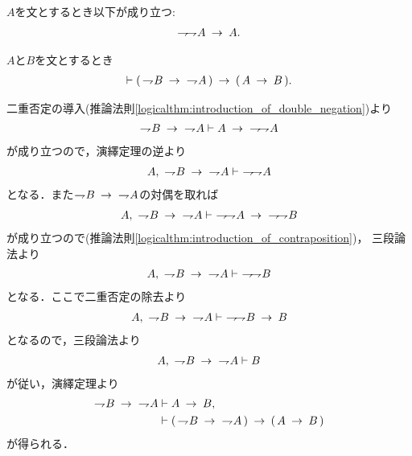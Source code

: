 	\begin{screen}
		\begin{logicalaxm}[二重否定の除去]
		\label{logicalaxm:elimination_of_double_negation}
			$A$を文とするとき以下が成り立つ:
			\begin{align}
				\negation \negation A \rarrow A.
			\end{align}
		\end{logicalaxm}
	\end{screen}
	
	\begin{screen}
		\begin{logicalthm}[対偶論法の原理]
		\label{logicalthm:proof_by_contraposition}
			$A$と$B$を文とするとき
			\begin{align}
				\vdash (\, \negation B \rarrow\ \negation A\, )
				\rarrow (\, A \rarrow B\, ).
			\end{align}
		\end{logicalthm}
	\end{screen}
	
	\begin{prf}
		二重否定の導入(推論法則\ref{logicalthm:introduction_of_double_negation})より
		\begin{align}
			\negation B \rarrow\ \negation A \vdash 
			A \rarrow\ \negation \negation A
		\end{align}
		が成り立つので，演繹定理の逆より
		\begin{align}
			A,\ \negation B \rarrow\ \negation A \vdash\ \negation \negation A
		\end{align}
		となる．また$\negation B \rarrow\ \negation A$の対偶を取れば
		\begin{align}
			A,\ \negation B \rarrow\ \negation A \vdash\ 
			\negation \negation A \rarrow\ \negation \negation B
		\end{align}
		が成り立つので(推論法則\ref{logicalthm:introduction_of_contraposition})，
		三段論法より
		\begin{align}
			A,\ \negation B \rarrow\ \negation A \vdash\ \negation \negation B
		\end{align}
		となる．ここで二重否定の除去より
		\begin{align}
			A,\ \negation B \rarrow\ \negation A \vdash\ 
			\negation \negation B \rarrow B
		\end{align}
		となるので，三段論法より
		\begin{align}
			A,\ \negation B \rarrow\ \negation A \vdash B
		\end{align}
		が従い，演繹定理より
		\begin{align}
			\negation B \rarrow\ \negation A &\vdash A \rarrow B, \\
			&\vdash (\, \negation B \rarrow\ \negation A\, ) 
			\rarrow (\, A \rarrow B\, )
		\end{align}
		が得られる．
		\QED
	\end{prf}
	
